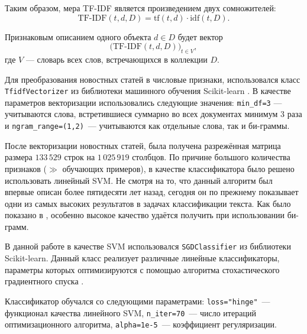 \documentclass[a4paper, 14pt]{extarticle}
\begin{document}
Таким образом, мера TF-IDF является произведением двух сомножителей:
$$
\text{TF-IDF}(t, d, D) = \text{tf}(t, d) \cdot \text{idf}(t, D).
$$

Признаковым описанием одного объекта $d \in D$ будет вектор
$$
\big(\text{TF-IDF}(t,d,D)\big)_{t\in V},
$$
где $V$ --- словарь всех слов, встречающихся в коллекции $D$.

Для преобразования новостных статей в числовые признаки, использовался класс \verb+TfidfVectorizer+ из библиотеки машинного обучения Scikit-learn 
\cite{scikit-learn}. В качестве параметров векторизации использовались следующие значения: \verb+min_df=3+ --- учитываются слова, встретившиеся 
суммарно во всех документах минимум 3 раза и  \verb+ngram_range=(1,2)+~--- учитываются как отдельные слова, так и би-граммы.

После векторизации новостных статей, была получена разрежённая матрица размера $133\,529$ строк на $1\,025\,919$ столбцов. По причине большого 
количества признаков ($\gg$  обучающих примеров), в качестве классификатора было решено использовать линейный SVM. Не смотря на то, что данный 
алгоритм был впервые описан более пятидесяти лет назад, сегодня он по прежнему показывает одни из самых высоких результатов в задачах классификации 
текста. Как было показано в \cite{wang12simple}, особенно высокое качество удаётся получить при использовании би-грамм.

В данной работе в качестве SVM использовался \verb+SGDClassifier+ из библиотеки Scikit-learn. Данный класс реализует различные линейные
классификаторы, параметры которых оптимизируются с помощью алгоритма стохастического градиентного спуска \cite{Bottou2010}.

Классификатор обучался со следующими параметрами: \verb+loss="hinge"+~--- функционал качества линейного SVM,
\verb+n_iter=70+~--- число итераций оптимизационного алгоритма, \verb+alpha=1e-5+~--- коэффициент регуляризации.
\end{document}
